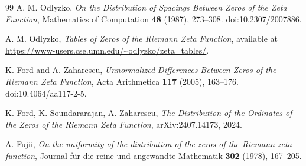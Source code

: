 \documentclass[11pt]{amsart}
\numberwithin{equation}{section}
\theoremstyle{plain}
\theoremstyle{definition}
\theoremstyle{remark}
\begin{document}
\begin{thebibliography}{99}
A. M. Odlyzko,
\emph{On the Distribution of Spacings Between Zeros of the Zeta Function},
Mathematics of Computation
\textbf{48} (1987),
273--308.
doi:10.2307/2007886.

A. M. Odlyzko,
\emph{Tables of Zeros of the Riemann Zeta Function},
available at
\url{https://www-users.cse.umn.edu/~odlyzko/zeta_tables/}.

K. Ford and A. Zaharescu,
\emph{Unnormalized Differences Between Zeros of the Riemann Zeta Function},
Acta Arithmetica
\textbf{117} (2005),
163--176.
doi:10.4064/aa117-2-5.

K. Ford,
K. Soundararajan,
A. Zaharescu,
\emph{The Distribution of the Ordinates of the Zeros of the Riemann Zeta Function},
arXiv:2407.14173,
2024.

A. Fujii,
\emph{On the uniformity of the distribution of the zeros of the
Riemann zeta function},
Journal f\"ur die reine und angewandte Mathematik
\textbf{302} (1978),
167--205.

\end{thebibliography}
\end{document}
